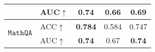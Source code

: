 \begin{table} [t]
{{\begin{tabular}{crcrcrcrcr}
         \multicolumn{2}{l}{}&\multicolumn{2}{l}{AUC$\uparrow$} & \multicolumn{2}{c}{\textbf{0.74}} & 
        \multicolumn{2}{c}{0.66}& 
        \multicolumn{2}{c}{0.69}  \\
         \midrule
         \multicolumn{2}{l}{\multirow{2}{*}{$\mathtt{MathQA}$}} &
        \multicolumn{2}{l}{ACC$\uparrow$} & 
        \multicolumn{2}{c}{\textbf{0.784}} & 
        \multicolumn{2}{c}{0.584}& 
        \multicolumn{2}{c}{0.747} \\
       
        
         \multicolumn{2}{l}{}&\multicolumn{2}{l}{AUC$\uparrow$} & \multicolumn{2}{c}{\textbf{0.74}} & 
        \multicolumn{2}{c}{0.67}& 
        \multicolumn{2}{c}{\textbf{0.74}}  \\
        
     
        

\end{tabular}}}
\end{table}
